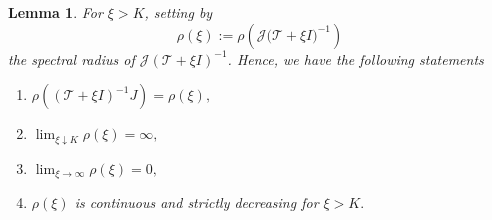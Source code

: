 \documentclass[a4paper,11pt]{amsart}
\newtheorem{lemma}[theorem]{Lemma}
\theoremstyle{definition}
\numberwithin{equation}{section}
\theoremstyle{definition}
\begin{document}
\begin{lemma}\label{lemma33}
For $\xi > K$, setting by
\[
\rho(\xi) := \rho\!\left(\mathscr J\big(\mathscr{T} + \xi I\big)^{-1}\right)
\]
the spectral radius of $\mathscr{J} (\mathscr{T} + \xi I)^{-1}$. Hence, we have the following statements
\begin{enumerate}
    \item $\rho\!\left((\mathscr{T} + \xi I)^{-1}J\right) = \rho(\xi),$
    \item $\displaystyle \lim_{\xi \downarrow K} \rho(\xi) = \infty,$
    \item $\displaystyle \lim_{\xi \to \infty} \rho(\xi) = 0,$
    \item $\rho(\xi)$ is continuous and strictly decreasing for $\xi > K.$
\end{enumerate}
\end{lemma}
\end{document}
